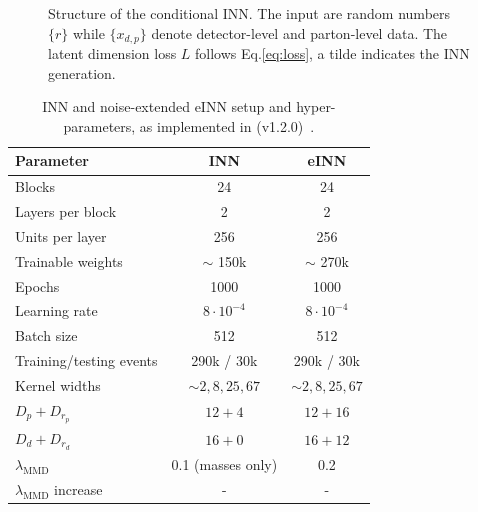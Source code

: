 \begin{figure}[t]
\centering

\caption{Structure of the conditional INN. The input are random
  numbers $\{ r\}$ while $\{ x_{d,p} \}$ denote detector-level and
  parton-level data. The latent dimension loss $L$ follows
  Eq.\eqref{eq:loss}, a tilde indicates the INN generation.}
\label{fig:cinn}
\end{figure}

\begin{table}[b!]
\centering
\begin{small} \begin{tabular}{l|c c}
\toprule
Parameter & INN & eINN  \\
\midrule
Blocks & 24 & 24\\
Layers per block & 2 & 2\\
Units per layer & 256 & 256\\
Trainable weights & $\sim$ 150k & $\sim$ 270k \\
Epochs & 1000 & 1000 \\
Learning rate & $8 \cdot 10 ^{-4}$ & $8 \cdot 10 ^{-4}$\\
Batch size & 512 & 512 \\
Training/testing events & 290k / 30k & 290k / 30k \\
Kernel widths & $\sim 2, 8, 25, 67$ & $\sim 2, 8, 25, 67$\\
$D_p+D_{r_p}$ & $12+4$ & $12+16$ \\
$D_d+D_{r_d}$ & $16+0$ & $16+12$ \\
$\lambda_\text{MMD}$ & 0.1 (masses only) & 0.2 \\
$\lambda_\text{MMD}$ increase & - & - \\
\bottomrule
\end{tabular} \end{small}
\caption{INN and noise-extended eINN setup and hyper-parameters, as
  implemented in \pytorch(v1.2.0)~\cite{pytorch}.}
\label{tab:inn}
\end{table}

